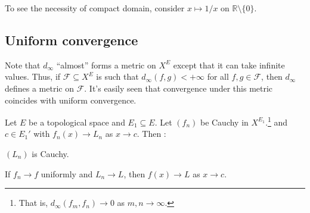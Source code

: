 	\begin{rmk}
		To see the necessity of compact domain, consider $x\mapsto 1/x$ on $\mathbb R\setminus\{0\}$.
	\end{rmk}
	
	
	
	
\subsection{Uniform convergence}

	Note that $d_\infty$ ``almost'' forms a metric on $X^E$ except that it can take infinite values. Thus, if $\mathscr F\subseteq X^E$ is such that $d_\infty(f, g) < +\infty$ for all $f, g\in \mathscr F$, then $d_\infty$ defines a metric on $\mathscr F$. It's easily seen that convergence under this metric coincides with uniform convergence.
	
	
	\begin{prp}
		Let $E$ be a topological space and $E_1\subseteq E$. Let $(f_n)$ be Cauchy in $X^{E_1}$.\footnote{
			That is, $d_\infty(f_m, f_n)\to 0$ as $m, n\to\infty$.
		} and $c\in E_1'$ with $f_n(x)\to L_n$ as $x\to c$. Then \tfh:
		\begin{mylist}
			\item $(L_n)$ is Cauchy.
			
			\item If $f_n\to f$ uniformly and $L_n\to L$, then $f(x)\to L$ as $x\to c$.
		\end{mylist}
	\end{prp}
	
